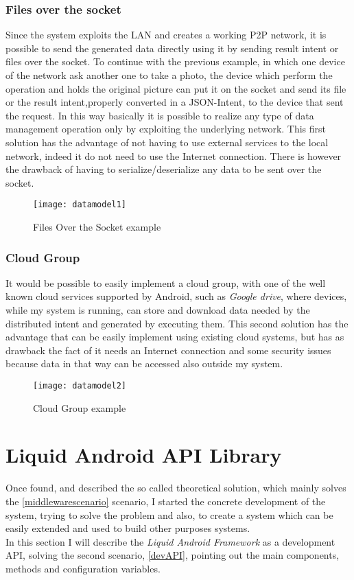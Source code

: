  \subsubsection{Files over the socket}\label{fos}
 Since the system exploits the LAN and creates a working P2P network, it is possible to send the generated data directly using it by sending result intent or files over the socket. To continue with the previous example, in which one device of the network ask another one to take a photo, the device which perform the operation and holds the original picture can put it on the socket and send its file or the result intent,properly converted in a JSON-Intent, to the device that sent the request. In this way basically it is possible to realize any type of data management operation only by exploiting the underlying network. This first solution has the advantage of not having to use external services to the local network, indeed it do not need to use the Internet connection. There is however the drawback of having to serialize/deserialize any data to be sent over the socket.
 \begin{figure}[h]
 	\centering
 	\texttt{[image: datamodel1]}
 	\caption{Files Over the Socket example}
 	\label{fig:4.5}
 \end{figure}
 \subsubsection{Cloud Group}
 It would be possible to easily implement a cloud group, with one of the well known cloud services supported by Android, such as \textit{Google drive}, where devices, while my system is running, can store and download data needed by the distributed intent and generated by executing them. This second solution has the advantage that can be easily implement using existing cloud systems, but has as drawback the fact of it needs an Internet connection and some security issues because data in that way can be accessed also outside my system.
 \begin{figure}[h]
 	\centering
 	\texttt{[image: datamodel2]}
 	\caption{Cloud Group example}
 	\label{fig:4.6}
 \end{figure}
\section{Liquid Android API Library}
Once found, and described the so called theoretical solution, which mainly solves the \ref{middlewarescenario} scenario, I started the concrete development of the system, trying to solve the problem and also, to create a system which can be easily extended and used to build other purposes systems.\\
In this section I will describe the \textit{Liquid Android Framework} as a development API, solving the second scenario, \ref{devAPI}, pointing out the main components, methods and configuration variables.
